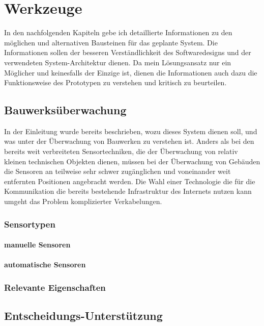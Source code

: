 \chapter{Werkzeuge}
In den nachfolgenden Kapiteln gebe ich detaillierte Informationen zu den möglichen und alternativen Bausteinen für das geplante System. Die Informationen sollen der besseren Verständlichkeit des Softwaredesigns und der verwendeten System-Architektur dienen. Da mein Lösungsansatz nur ein Möglicher und keinesfalls der Einzige ist, dienen die Informationen auch dazu die Funktionsweise des Prototypen zu verstehen und kritisch zu beurteilen.

\section{Bauwerksüberwachung}
In der Einleitung wurde bereits beschrieben, wozu dieses System dienen soll, und was unter der Überwachung von Bauwerken zu verstehen ist. Anders als bei den bereits weit verbreiteten Sensortechniken, die der Überwachung von relativ kleinen technischen Objekten dienen, müssen bei der Überwachung von Gebäuden die Sensoren an teilweise sehr schwer zugänglichen und voneinander weit entfernten Positionen angebracht werden. Die Wahl einer Technologie die für die Kommunikation die bereits bestehende Infrastruktur des Internets nutzen kann umgeht das Problem komplizierter Verkabelungen.

\subsection{Sensortypen}
\subsubsection{manuelle Sensoren}
\subsubsection{automatische Sensoren}
\subsection{Relevante Eigenschaften}

\section{Entscheidungs-Unterstützung}

